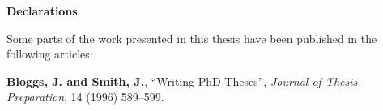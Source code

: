 \pagestyle{plain}

\begin{center}
    {\LARGE\bf Declarations}
\end{center}

Some parts of the work presented in this thesis have been published in
the following articles:

\begin{trivlist}
\setlength{\leftmargin}{1cm}
\setlength{\itemindent}{-1cm}

\item {\bf Bloggs, J. and Smith, J.}, ``Writing PhD Theses'', \emph{Journal of Thesis Preparation}, 14
(1996) 589--599.

\end{trivlist}

\newpage

